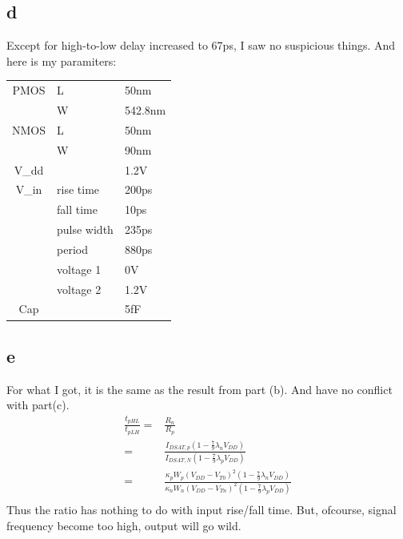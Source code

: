 \documentclass[a4paper,10pt]{article}
\begin{document}
\subsection*{d}
Except for high-to-low delay increased to 67ps, I saw no suspicious things. And here is my paramiters:\\
\begin{tabular}{c l l}
 PMOS	&	L	&	50nm\\
	&	W	&	542.8nm\\
 NMOS	&	L	&	50nm\\
	&	W	&	90nm\\
 V\_dd	&		&	1.2V\\
 V\_in	&	rise time	&	200ps\\
	&	fall time	&	10ps\\
	&	pulse width	&	235ps\\
	&	period	&	880ps\\
	&	voltage 1	&	0V\\
	&	voltage 2	&	1.2V\\
 Cap	&		&	5fF\\
\end{tabular}
\subsection*{e}
For what I got, it is the same as the result from part (b). And have no conflict with part(c).
\begin{equation}
 \begin{split}
  \frac{t_{pHL}}{t_{pLH}} =& \frac{R_n}{R_p}\\
  =& \frac{I_{DSAT, p}(1-\frac{7}{9}\lambda_n V_{DD})}{I_{DSAT, N}(1-\frac{7}{9}\lambda_p V_{DD})}\\
  =& \frac{\kappa_p W_p (V_{DD} - V_{T0})^2 (1-\frac{7}{9}\lambda_n V_{DD})}{\kappa_n W_n (V_{DD} - V_{Tn})^2 (1-\frac{7}{9}\lambda_p V_{DD})}\\
 \end{split}
\end{equation}
Thus the ratio has nothing to do with input rise/fall time. But, ofcourse, signal frequency become too high, output will go
wild.
\end{document}
